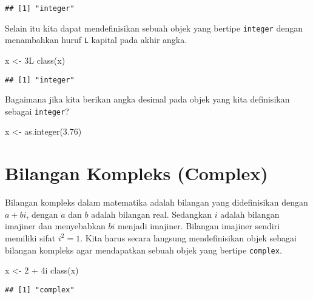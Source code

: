 \documentclass[
]{book}
\newenvironment{Shaded}{\begin{snugshade}}{\end{snugshade}}
\newcommand{\DecValTok}[1]{\textcolor[rgb]{0.00,0.00,0.81}{#1}}
\newcommand{\FloatTok}[1]{\textcolor[rgb]{0.00,0.00,0.81}{#1}}
\newcommand{\FunctionTok}[1]{\textcolor[rgb]{0.00,0.00,0.00}{#1}}
\newcommand{\NormalTok}[1]{#1}
\newcommand{\OtherTok}[1]{\textcolor[rgb]{0.56,0.35,0.01}{#1}}
\newcommand{\SpecialCharTok}[1]{\textcolor[rgb]{0.00,0.00,0.00}{#1}}
\begin{document}
\begin{verbatim}
## [1] "integer"
\end{verbatim}

Selain itu kita dapat mendefinisikan sebuah objek yang bertipe \texttt{integer} dengan menambahkan huruf \texttt{L} kapital pada akhir angka.

\begin{Shaded}
\begin{Highlighting}[]
\NormalTok{x }\OtherTok{\textless{}{-}}\NormalTok{ 3L}
\FunctionTok{class}\NormalTok{(x)}
\end{Highlighting}
\end{Shaded}

\begin{verbatim}
## [1] "integer"
\end{verbatim}

Bagaimana jika kita berikan angka desimal pada objek yang kita definisikan sebagai \texttt{integer}?

\begin{Shaded}
\begin{Highlighting}[]
\NormalTok{x }\OtherTok{\textless{}{-}} \FunctionTok{as.integer}\NormalTok{(}\FloatTok{3.76}\NormalTok{)}
\end{Highlighting}
\end{Shaded}

\hypertarget{complex}{%
\section{Bilangan Kompleks (Complex)}\label{complex}}

Bilangan kompleks dalam matematika adalah bilangan yang didefinisikan dengan \(a + bi\), dengan \(a\) dan \(b\) adalah bilangan real. Sedangkan \(i\) adalah bilangan imajiner dan menyebabkan \(bi\) menjadi imajiner. Bilangan imajiner sendiri memiliki sifat \(i^{2}=1\). Kita harus secara langsung mendefinisikan objek sebagai bilangan kompleks agar mendapatkan sebuah objek yang bertipe \texttt{complex}.

\begin{Shaded}
\begin{Highlighting}[]
\NormalTok{x }\OtherTok{\textless{}{-}} \DecValTok{2} \SpecialCharTok{+}\NormalTok{ 4i}
\FunctionTok{class}\NormalTok{(x)}
\end{Highlighting}
\end{Shaded}

\begin{verbatim}
## [1] "complex"
\end{verbatim}
\end{document}
